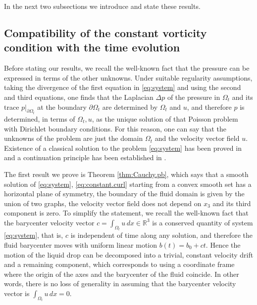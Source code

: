 \documentclass[10pt,reqno,a4paper]{article}
\numberwithin{equation}{section}
\theoremstyle{plain}
\theoremstyle{definition}
\newcommand{\R}{{\mathbb R}}
\newcommand{\Om}{\Omega}
\newcommand{\pa}{\partial}
\begin{document}
In the next two subsections we introduce and state these results. 


\subsection{{Compatibility of the constant vorticity condition with the time evolution}}

Before stating our results, we recall the well-known fact that the pressure 
can be expressed in terms of the other unknowns.  
Under suitable regularity assumptions, 
taking the divergence of the first equation in \eqref{eq:system} 
and using the second and third equations, one finds that 
the Laplacian $\Delta p$ of the pressure in $\Om_t$ 
and its trace $p|_{\pa \Om_t}$ at the boundary $ \pa \Om_t$ 
are determined by $\Om_t$ and $u$, 
and therefore $p$ is determined, in terms of $\Om_t,u$, 
as the unique solution of that Poisson problem with Dirichlet boundary conditions. 
For this reason, one can say that the unknowns of the problem are 
just the domain $\Om_t$ and the velocity vector field $u$. 
Existence of a classical solution to the problem \eqref{eq:system} has been proved in \cite{CS} and a continuation principle has been established in \cite{JL}.


The first result we prove is Theorem \ref{thm:Cauchy.pb}, 
which says that a smooth solution of \eqref{eq:system}, \eqref{eq:constant.curl} 
starting from a convex smooth set has a horizontal plane of symmetry, 
the boundary of the fluid domain is given by the union of two graphs, 
the velocity vector field does not depend on $x_3$ 
and its third component is zero. 
To simplify the statement, we recall the well-known fact that the barycenter velocity vector 
$c = \int_{\Om_t} u \, dx \in \R^3$ is a conserved quantity of system \eqref{eq:system}, 
that is, $c$ is independent of time along any solution, 
and therefore the fluid barycenter moves with uniform linear motion $b(t) = b_0 + c t$.
Hence the motion of the liquid drop can be decomposed into 
a trivial, constant velocity drift and a remaining component, 
which corresponds to using a coordinate frame 
where the origin of the axes and the barycenter of the fluid coincide. 
In other words, there is no loss of generality in assuming that the barycenter velocity vector 
is $\int_{\Om_t} u \, dx = 0$. 
  
\end{document}
